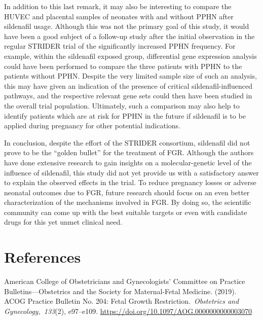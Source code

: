 \documentclass[authordate, reflection]{jote-new-article}
\begin{document}
	In addition to this last remark, it may also be interesting to compare the HUVEC and placental samples of neonates with and without PPHN after sildenafil usage. Although this was not the primary goal of this study, it would have been a good subject of a follow-up study after the initial observation in the regular STRIDER trial of the significantly increased PPHN frequency. For example, within the sildenafil exposed group, differential gene expression analysis could have been performed to compare the three patients with PPHN to the patients without PPHN. Despite the very limited sample size of such an analysis, this may have given an indication of the presence of critical sildenafil-influenced pathways, and the respective relevant gene sets could then have been studied in the overall trial population. Ultimately, such a comparison may also help to identify patients which are at risk for PPHN in the future if sildenafil is to be applied during pregnancy for other potential indications.



	In conclusion, despite the effort of the STRIDER consortium, sildenafil did not prove to be the “golden bullet” for the treatment of FGR. Although the authors have done extensive research to gain insights on a molecular-genetic level of the influence of sildenafil, this study did not yet provide us with a satisfactory answer to explain the observed effects in the trial. To reduce pregnancy losses or adverse neonatal outcomes due to FGR, future research should focus on an even better characterization of the mechanisms involved in FGR. By doing so, the scientific community can come up with the best suitable targets or even with candidate drugs for this yet unmet clinical need.











	\section{References}



	American College of Obstetricians and Gynecologists' Committee on Practice Bulletins—Obstetrics and the Society for Maternal-Fetal Medicine. (2019). ACOG Practice Bulletin No. 204: Fetal Growth Restriction. \emph{Obstetrics and Gynecology, 133}(2), e97--e109. \url{https://doi.org/10.1097/AOG.0000000000003070}
\end{document}
